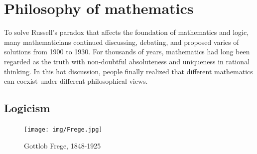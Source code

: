 \documentclass{article}
\begin{document}
\begin{Exercise}
\end{Exercise}

\section{Philosophy of mathematics}

To solve Russell's paradox that affects the foundation of mathematics and logic, many mathematicians continued discussing, debating, and proposed varies of solutions from 1900 to 1930. For thousands of years, mathematics had long been regarded as the truth with non-doubtful absoluteness and uniqueness in rational thinking. In this hot discussion, people finally realized that different mathematics can coexist under different philosophical views.

\subsection{Logicism}

\begin{figure}
 \centering
 \texttt{[image: img/Frege.jpg]}
 \captionsetup{labelformat=empty}
 \caption{Gottlob Frege, 1848-1925}
 \label{fig:Frege}
\end{figure}

\end{document}
